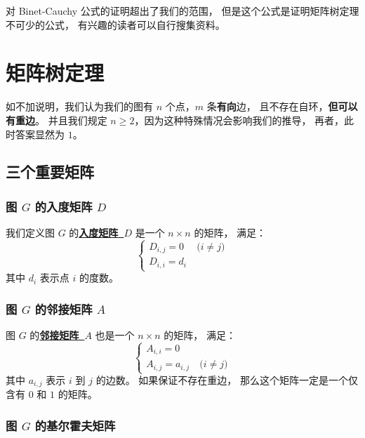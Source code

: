 \documentclass[UTF8]{article}
\begin{document}
	对 Binet-Cauchy 公式的证明超出了我们的范围，
	但是这个公式是证明矩阵树定理不可少的公式，
	有兴趣的读者可以自行搜集资料。

	\section{矩阵树定理}

	如不加说明，我们认为我们的图有 $n$ 个点，$m$ 条\textbf{有向}边，
	且不存在自环，\textbf{但可以有重边}。
	并且我们规定 $n \ge 2$，因为这种特殊情况会影响我们的推导，
	再者，此时答案显然为 $1$。

	\subsection{三个重要矩阵}

	\subsubsection{图 $G$ 的入度矩阵 $D$}

	我们定义图 $G$ 的\textbf{\uline{入度矩阵~$D$}} 是一个 $n \times n$ 的矩阵，
	满足：
	\begin{equation*}
		\begin{cases}
			D_{i, j} = 0 & \pod {i \ne j}
			\\
			D_{i, i} = d_i
		\end{cases}
	\end{equation*}
	其中 $d_i$ 表示点 $i$ 的度数。

	\subsubsection{图 $G$ 的邻接矩阵 $A$}

	图 $G$ 的\textbf{\uline{邻接矩阵~$A$}} 也是一个 $n \times n$ 的矩阵，
	满足：
	\begin{equation*}
		\begin{cases}
			A_{i, i} = 0
			\\
			A_{i, j} = a_{i, j} & \pod {i \ne j}
		\end{cases}
	\end{equation*}
	其中 $a_{i, j}$ 表示 $i$ 到 $j$ 的边数。
	如果保证不存在重边，
	那么这个矩阵一定是一个仅含有 $0$ 和 $1$ 的矩阵。

	\subsubsection{图 $G$ 的基尔霍夫矩阵}
\end{document}
